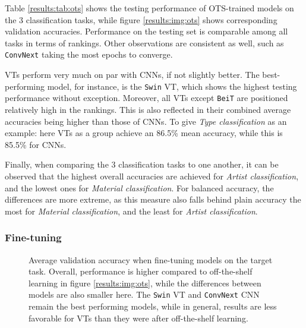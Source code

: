 Table \ref{results:tab:ots} shows the testing performance of OTS-trained models on the 3 classification tasks, while figure \ref{results:img:ots} shows corresponding validation accuracies. Performance on the testing set is comparable among all tasks in terms of rankings. Other observations are consistent as well, such as \texttt{ConvNext} taking the most epochs to converge.

VTs perform very much on par with CNNs, if not slightly better. The best-performing model, for instance, is the \texttt{Swin} VT, which shows the highest testing performance without exception. Moreover, all VTs except \texttt{BeiT} are positioned relatively high in the rankings. This is also reflected in their combined average accuracies being higher than those of CNNs. To give \textit{Type classification} as an example: here VTs as a group achieve an 86.5\% mean accuracy, while this is 85.5\% for CNNs.

Finally, when comparing the 3 classification tasks to one another, it can be observed that the highest overall accuracies are achieved for \textit{Artist classification}, and the lowest ones for \textit{Material classification}. For balanced accuracy, the differences are more extreme, as this measure also falls behind plain accuracy the most for \textit{Material classification}, and the least for \textit{Artist classification}.



\subsubsection{Fine-tuning} \label{results:ft}

\begin{figure}[tb]
    \centering
    \def\svgwidth{\textwidth}
    
    \caption{Average validation accuracy when fine-tuning models on the target task. Overall, performance is higher compared to off-the-shelf learning in figure \ref{results:img:ots}, while the differences between models are also smaller here. The \texttt{Swin} VT and \texttt{ConvNext} CNN remain the best performing models, while in general, results are less favorable for VTs than they were after off-the-shelf learning.}
    \label{results:img:ft}
\end{figure}

